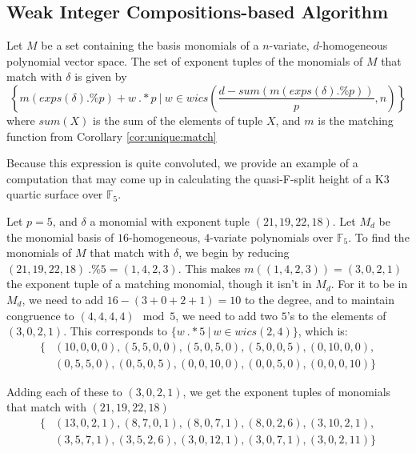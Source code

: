 \subsection{Weak Integer Compositions-based Algorithm}

\begin{lem}
    \label{lem:generate:matching}
    Let $M$ be a set containing the basis monomials of a $n$-variate, $d$-homogeneous polynomial vector space.
    The set of exponent tuples of the monomials of $M$ that match with $\delta$ is given by 
    \[
        \left\{ m(exps(\delta) .\% p) + w ~.*p ~\Big|~ w \in wics \left(\frac{d - sum(m(exps(\delta) .\% p))}{p}, n \right) \right\}
    \]
    where $sum(X)$ is the sum of the elements of tuple $X$, and $m$ is the matching function from Corollary \ref{cor:unique:match}
\end{lem}

Because this expression is quite convoluted, we provide an example of a computation 
that may come up in calculating the quasi-F-split height of a K3 quartic surface over $\mathbb{F}_5$.

\begin{ex}
    Let $p = 5$, and $\delta$ a monomial with exponent tuple $(21, 19, 22, 18)$. 
    Let $M_d$ be the monomial basis of $16$-homogeneous, $4$-variate polynomials over $\mathbb{F}_5$. 
    To find the monomials of $M$ that match with $\delta$, we begin by reducing $(21, 19, 22, 18) ~.\% 5 = (1, 4, 2, 3)$.
    This makes $m((1, 4, 2, 3)) = (3, 0, 2, 1)$ the exponent tuple of a matching monomial, though it isn't in $M_d$. 
    For it to be in $M_d$, we need to add $16 - (3 + 0 + 2 + 1) = 10$ to the degree, and to maintain congruence to $(4, 4, 4, 4) \mod 5$, we need to add two $5$'s to the elements of $(3, 0, 2, 1)$. This corresponds to $\{w ~.* 5 ~|~ w \in wics(2, 4)\}$, which is:
    \begin{align*}
        \{&(10, 0, 0, 0), (5, 5, 0, 0), (5, 0, 5, 0), (5, 0, 0, 5), (0, 10, 0, 0), \\
        &(0, 5, 5, 0), (0, 5, 0, 5), (0, 0, 10, 0), (0, 0, 5, 0), (0, 0, 0, 10)\}
    \end{align*}
        
    \noindent Adding each of these to $(3, 0, 2, 1)$, we get the exponent tuples of monomials that match with $(21, 19, 22, 18)$
    \begin{align*}
        \{&(13, 0, 2, 1), (8, 7, 0, 1), (8, 0, 7, 1), (8, 0, 2, 6), (3, 10, 2, 1), \\
        &(3, 5, 7, 1), (3, 5, 2, 6), (3, 0, 12, 1), (3, 0, 7, 1), (3, 0, 2, 11)\}
    \end{align*}    
\end{ex}

